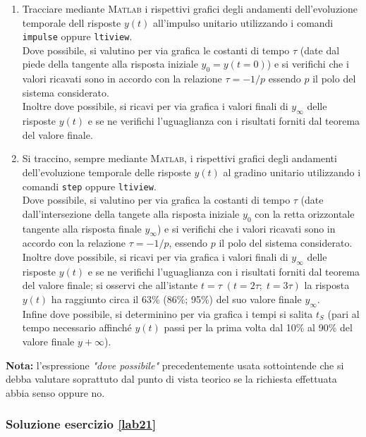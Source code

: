 \documentclass[../main.tex]{subfiles}
\begin{document}
\begin{enumerate}
	\item Tracciare mediante \textsc{Matlab} i rispettivi grafici degli andamenti dell'evoluzione temporale dell risposte $y(t)$ all'impulso unitario utilizzando i comandi \texttt{impulse} oppure \texttt{ltiview}. \\
	Dove possibile, si valutino per via grafica le costanti di tempo $\tau$ (date dal piede della tangente alla risposta iniziale $y_0 = y(t=0)$) e si verifichi che i valori ricavati sono in accordo con la relazione $\tau = -1 / p$ essendo $p$ il polo del sistema considerato. \\
	Inoltre dove possibile, si ricavi per via grafica i valori finali di $y_\infty$ delle risposte $y(t)$ e se ne verifichi l'uguaglianza con i risultati forniti dal teorema del valore finale.
	\item Si traccino, sempre mediante \textsc{Matlab}, i rispettivi grafici degli andamenti dell'evoluzione temporale delle risposte $y(t)$ al gradino unitario utilizzando i comandi \texttt{step} oppure \texttt{ltiview}. \\
	Dove possibile, si valutino per via grafica la costanti di tempo $\tau$ (date dall'intersezione della tangete alla risposta iniziale $y_0$ con la retta orizzontale tangente alla risposta finale $y_\infty$) e si verifichi che i valori ricavati sono in accordo con la relazione $\tau = -1/p$, essendo $p$ il polo del sistema considerato. \\
	Inoltre dove possibile, si ricavi per via grafica i valori finali di $y_\infty$ delle risposte $y(t)$ e se ne verifichi l'uguaglianza con i risultati forniti dal teorema del valore finale; si osservi che all'istante $t = \tau\; (t = 2\tau; \; t = 3\tau)$ la risposta $y(t)$ ha raggiunto circa il 63\% (86\%; 95\%) del suo valore finale $y_\infty$.\\
	Infine dove possibile, si determinino per via grafica i tempi si salita $t_S$ (pari al tempo necessario affinché $y(t)$ passi per la prima volta dal 10\% al 90\% del valore finale $y+\infty$). 

\end{enumerate}

\textbf{Nota:} l'espressione \textit{"dove possibile"} precedentemente usata sottointende che si debba valutare soprattuto dal punto di vista teorico se la richiesta effettuata abbia senso oppure no.


\subsubsection*{Soluzione esercizio \ref{lab21}}
\end{document}
